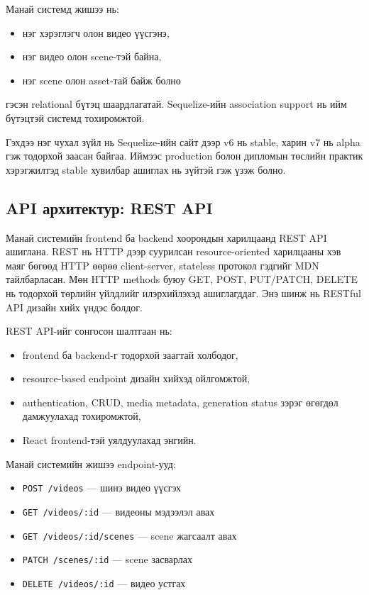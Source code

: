 Манай системд жишээ нь:

\begin{itemize}
\item нэг хэрэглэгч олон видео үүсгэнэ,
\item нэг видео олон scene-тэй байна,
\item нэг scene олон asset-тай байж болно
\end{itemize}

гэсэн relational бүтэц шаардлагатай. Sequelize-ийн association support нь ийм бүтэцтэй системд тохиромжтой.

Гэхдээ нэг чухал зүйл нь Sequelize-ийн сайт дээр v6 нь stable, харин v7 нь alpha гэж тодорхой заасан байгаа. Иймээс production болон дипломын төслийн практик хэрэгжилтэд stable хувилбар ашиглах нь зүйтэй гэж үзэж болно.

\subsection{API архитектур: REST API}

Манай системийн frontend ба backend хоорондын харилцаанд REST API ашиглана. REST нь HTTP дээр суурилсан resource-oriented харилцааны хэв маяг бөгөөд HTTP өөрөө client-server, stateless протокол гэдгийг MDN тайлбарласан. Мөн HTTP methods буюу GET, POST, PUT/PATCH, DELETE нь тодорхой төрлийн үйлдлийг илэрхийлэхэд ашиглагддаг. Энэ шинж нь RESTful API дизайн хийх үндэс болдог.

REST API-ийг сонгосон шалтгаан нь:

\begin{itemize}
\item frontend ба backend-г тодорхой заагтай холбодог,
\item resource-based endpoint дизайн хийхэд ойлгомжтой,
\item authentication, CRUD, media metadata, generation status зэрэг өгөгдөл дамжуулахад тохиромжтой,
\item React frontend-тэй уялдуулахад энгийн.
\end{itemize}

Манай системийн жишээ endpoint-ууд:

\begin{itemize}
\item \texttt{POST /videos} --- шинэ видео үүсгэх
\item \texttt{GET /videos/:id} --- видеоны мэдээлэл авах
\item \texttt{GET /videos/:id/scenes} --- scene жагсаалт авах
\item \texttt{PATCH /scenes/:id} --- scene засварлах
\item \texttt{DELETE /videos/:id} --- видео устгах
\end{itemize}

